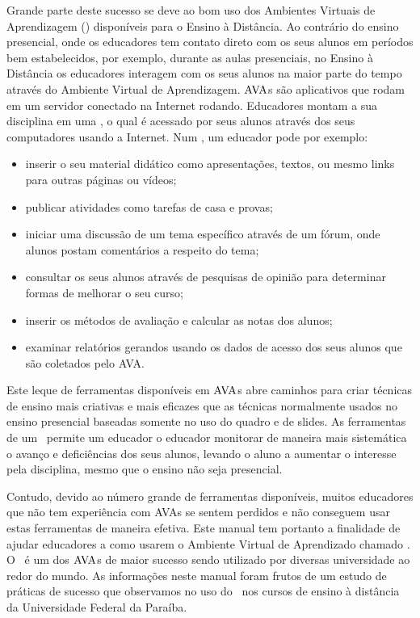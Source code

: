 Grande parte deste sucesso se deve ao bom uso dos Ambientes Virtuais de Aprendizagem (\ava) disponíveis para
o Ensino à Distância. Ao contrário do ensino presencial, onde os educadores tem contato direto 
com os seus alunos em períodos bem estabelecidos, por exemplo, durante as aulas presenciais, 
no Ensino à Distância os educadores interagem com os seus alunos na maior parte do tempo 
através do Ambiente Virtual de Aprendizagem. $\hbox{AVA}$s são aplicativos que rodam em um servidor 
conectado na Internet rodando. Educadores montam a sua disciplina em uma \ava, o qual é acessado 
por seus alunos através dos seus computadores usando a Internet. Num \ava, um educador pode por exemplo:
\begin{itemize}
 \item inserir o seu material didático como apresentações, textos, ou mesmo links para outras páginas ou vídeos;
 \item publicar atividades como tarefas de casa e provas;
 \item iniciar uma discussão de um tema específico através de um fórum, onde alunos postam comentários a 
 respeito do tema;
 \item consultar os seus alunos através de pesquisas de opinião para determinar formas de melhorar o seu curso;
 \item inserir os métodos de avaliação e calcular as notas dos alunos;
 \item examinar relatórios gerandos usando os dados de acesso dos seus alunos que são 
coletados pelo AVA.
\end{itemize}
Este leque de ferramentas disponíveis em $\hbox{AVA}$s abre caminhos para criar técnicas de ensino 
mais criativas e mais eficazes que as técnicas normalmente usados no ensino presencial
baseadas somente no uso do quadro e de slides. As ferramentas de um \ava\ permite um educador 
o educador monitorar de maneira mais sistemática o avanço e deficiências dos seus alunos, 
levando o aluno a aumentar o interesse pela disciplina, mesmo que o ensino não seja presencial. 

Contudo, devido ao número grande de ferramentas disponíveis, muitos educadores que não tem experiência 
com AVAs se sentem perdidos e não conseguem usar estas ferramentas de maneira efetiva. 
Este manual tem portanto a finalidade de ajudar educadores a como usarem o Ambiente Virtual de Aprendizado
chamado \emph{\moodle}. O \moodle\ é um dos $\hbox{AVA}$s de maior sucesso sendo utilizado por diversas 
universidade ao redor do mundo. As informações neste manual foram frutos de um 
estudo de práticas de sucesso que observamos no uso do \moodle\ 
nos cursos de ensino à distância da Universidade Federal da Paraíba. 

